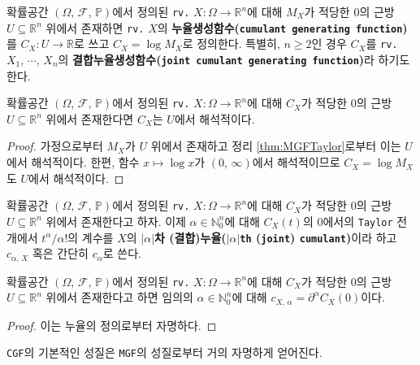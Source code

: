 \begin{definition}
    확률공간 $(\Omega,\,\mathcal{F},\,\mathbb{P})$에서 정의된 \texttt{rv.} $X:\Omega\to\mathbb{R}^n$에 대해 $M_X$가 적당한 $0$의 근방 $U\subseteq\mathbb{R}^n$ 위에서 존재하면 \texttt{rv.} $X$의 \textbf{누율생성함수(\texttt{cumulant generating function})}를 $C_X:U\to\mathbb{R}$로 쓰고 $C_X=\log M_X$로 정의한다. 특별히, $n\geq2$인 경우 $C_X$를 \texttt{rv.} $X_1,\,\cdots,\,X_n$의 \textbf{결합누율생성함수(\texttt{joint cumulant generating function})}라 하기도 한다.
\end{definition}

\begin{proposition}
    확률공간 $(\Omega,\,\mathcal{F},\,\mathbb{P})$에서 정의된 \texttt{rv.} $X:\Omega\to\mathbb{R}^n$에 대해 $C_X$가 적당한 $0$의 근방 $U\subseteq\mathbb{R}^n$ 위에서 존재한다면 $C_X$는 $U$에서 해석적이다.
\end{proposition}

\begin{proof}
    가정으로부터 $M_X$가 $U$ 위에서 존재하고 정리 \ref{thm:MGFTaylor}로부터 이는 $U$에서 해석적이다. 한편, 함수 $x\mapsto\log x$가 $(0,\,\infty)$에서 해석적이므로 $C_X=\log M_X$도 $U$에서 해석적이다.
\end{proof}

\begin{definition}
    확률공간 $(\Omega,\,\mathcal{F},\,\mathbb{P})$에서 정의된 \texttt{rv.} $X:\Omega\to\mathbb{R}^n$에 대해 $C_X$가 적당한 $0$의 근방 $U\subseteq\mathbb{R}^n$ 위에서 존재한다고 하자. 이제 $\alpha\in\mathbb{N}_0^n$에 대해 $C_X(t)$의 $0$에서의 \texttt{Taylor} 전개에서 $t^\alpha/\alpha!$의 계수를 $X$의 \textbf{$|\alpha|$차 (결합)누율($|\alpha|$\texttt{th} (\texttt{joint}) \texttt{cumulant})}이라 하고 $c_{\alpha,\,X}$ 혹은 간단히 $c_\alpha$로 쓴다.
\end{definition}

\begin{theorem}
    확률공간 $(\Omega,\,\mathcal{F},\,\mathbb{P})$에서 정의된 \texttt{rv.} $X:\Omega\to\mathbb{R}^n$에 대해 $C_X$가 적당한 $0$의 근방 $U\subseteq\mathbb{R}^n$ 위에서 존재한다고 하면 임의의 $\alpha\in\mathbb{N}_0^n$에 대해 $c_{X,\,\alpha}=\partial^\alpha C_X(0)$이다.
\end{theorem}

\begin{proof}
    이는 누율의 정의로부터 자명하다.
\end{proof}

\texttt{CGF}의 기본적인 성질은 \texttt{MGF}의 성질로부터 거의 자명하게 얻어진다.


